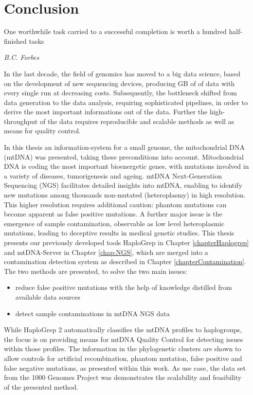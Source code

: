 \chapter{Conclusion}
\label{chap:conclusion}

\epigraph{One worthwhile task carried to a successful completion is worth a hundred half-finished tasks}{\textit{B.C. Forbes}}

In the last decade, the  field of genomics has moved to a big data science, based on the development of new sequencing devices, producing GB of of data with every single run at decreasing costs. Subsequently, the bottleneck shifted from data generation to the data analysis, requiring sophisticated pipelines, in order to derive the most important informations out of the data. Further the high-throughput of the data requires reproducible and scalable methods as well as means for quality control. 

In this thesis an information-system for a small genome, the mitochondrial DNA (mtDNA) was presented, taking these preconditions into account. Mitochondrial DNA is coding the most important bioenergetic genes, with mutations involved in a variety of diseases, tumorigenesis and ageing. mtDNA Next-Generation Sequencing (NGS) facilitates detailed insights into mtDNA, enabling to identify new mutations among thousands non-mutated (heteroplasmy) in high resolution. This higher resolution requires additional caution: phantom mutations can become apparent as false positive mutations. A further major issue is the emergence of sample contamination, observable as low level heteroplasmic mutations, leading to deceptive results in medical genetic studies.
This thesis presents our previously developed tools HaploGrep in Chapter \ref{chapterHaplogrep} and mtDNA-Server in Chapter \ref{chap:NGS}, which are merged into a contamination detection system as described in Chapter \ref{chapterContamination}. The two methods are presented, to solve the two main issues:
\begin{itemize}
\item reduce false positive mutations with the help of knowledge distilled from available data sources  
\item detect sample contaminations in mtDNA NGS data
\end{itemize}
While HaploGrep 2 automatically classifies the mtDNA profiles to haplogroups, the focus is on providing means for mtDNA Quality Control for detecting issues within those profiles. The information in the phylogenetic clusters are shown to allow controls for artificial recombination, phantom mutation, false positive and false negative mutations, as presented within this work. As use case, the data set from the 1000 Genomes Project was demonstrates the scalability and feasibility of the presented method.

